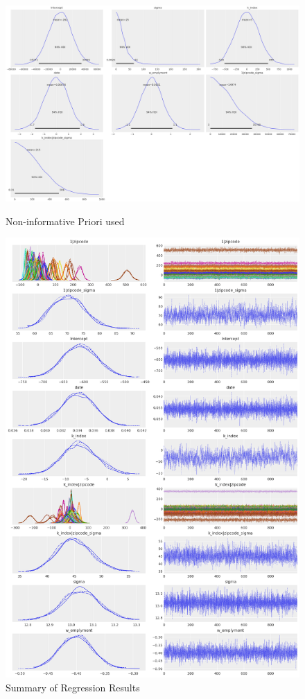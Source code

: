 \documentclass[12pt]{article}
\begin{document}
\begin{figure}[H]
	\centering
	\begin{minipage}[t]{0.48\textwidth}
		\centering
		\includegraphics[width=\textwidth]{priori.png}
		\caption{Non-informative Priori used}
		\label{fig:priori}
	\end{minipage}
	\hfill
	\begin{minipage}[t]{0.48\textwidth}
		\centering
		\includegraphics[width=\textwidth]{results.png}
		\caption{Summary of Regression Results}
		\label{fig:results}
	\end{minipage}
\end{figure}
\end{document}
